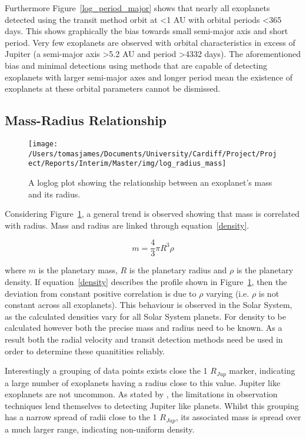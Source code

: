 \documentclass{report}
\begin{document}
Furthermore Figure~\ref{log_period_major} shows that nearly all exoplanets detected using the transit method orbit at \textless 1 AU with orbital periods \textless 365 days. This shows graphically the bias towards small semi-major axis and short period. Very few exoplanets are observed with orbital characteristics in excess of Jupiter (a semi-major axis \textgreater 5.2 AU and period \textgreater 4332 days). The aforementioned bias and minimal detections using methods that are capable of detecting exoplanets with larger semi-major axes and longer period mean the existence of exoplanets at these orbital parameters cannot be dismissed.

\subsection*{Mass-Radius Relationship}

\begin{figure}[H]
\centering
    \texttt{[image: /Users/tomasjames/Documents/University/Cardiff/Project/Project/Reports/Interim/Master/img/log\_radius\_mass]}
\caption{A loglog plot showing the relationship between an exoplanet's mass and its radius.}\label{log_radius_mass}
\end{figure}

Considering Figure~\ref{log_radius_mass}, a general trend is observed showing that mass is correlated with radius. Mass and radius are linked through equation~\ref{density}.

\begin{equation} \label{density}
    m = \frac{4}{3}\pi R^3 \rho
\end{equation}

 where $m$ is the planetary mass, $R$ is the planetary radius and $\rho$ is the planetary density. If equation~\ref{density} describes the profile shown in Figure~\ref{log_radius_mass}, then the deviation from constant positive correlation is due to $\rho$ varying (i.e. $\rho$ is not constant across all exoplanets). This behaviour is observed in the Solar System, as the calculated densities vary for all Solar System planets. For density to be calculated however both the precise mass and radius need to be known. As a result both the radial velocity and transit detection methods need be used in order to determine these quanitities reliably.

 Interestingly a grouping of data points exists close the 1 $R_{Jup}$ marker, indicating a large number of exoplanets having a radius close to this value. Jupiter like exoplanets are not uncommon. As stated by \textcite{stats}, the limitations in observation techniques lend themselves to detecting Jupiter like planets. Whilst this grouping has a narrow spread of radii close to the 1 $R_{Jup}$, its associated mass is spread over a much larger range, indicating non-uniform density.
\end{document}
